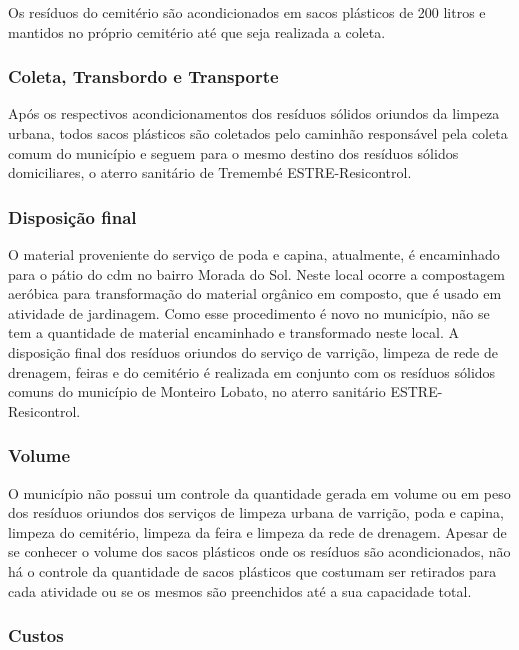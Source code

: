 	
	Os resíduos do cemitério são acondicionados em sacos plásticos de 200 litros e mantidos no próprio cemitério até que seja realizada a coleta.
	
	\subsubsection{Coleta, Transbordo e Transporte}
	
	Após os respectivos acondicionamentos dos resíduos sólidos oriundos da limpeza urbana, todos sacos plásticos são coletados pelo caminhão responsável pela coleta comum do município e seguem para o mesmo destino dos resíduos sólidos domiciliares, o aterro sanitário de Tremembé ESTRE-Resicontrol.
	
	\subsubsection{Disposição final}
	O material proveniente do serviço de poda e capina, atualmente, é encaminhado para o pátio do \gls{cdm} no bairro Morada do Sol. Neste local ocorre a compostagem aeróbica para transformação do material orgânico em composto, que é usado em atividade de jardinagem. Como esse procedimento é novo no município, não se tem a quantidade de material encaminhado e transformado neste local. 
	A disposição final dos resíduos oriundos do serviço de varrição, limpeza de rede de drenagem, feiras e do cemitério é realizada em conjunto com os resíduos sólidos comuns do município de Monteiro Lobato, no aterro sanitário ESTRE-Resicontrol.
	
	\subsubsection{Volume}
	
	O município não possui um controle da quantidade gerada em volume ou em peso dos resíduos oriundos dos serviços de limpeza urbana de varrição, poda e capina, limpeza do cemitério, limpeza da feira e limpeza da rede de drenagem.
	Apesar de se conhecer o volume dos sacos plásticos onde os resíduos são acondicionados, não há o controle da quantidade de sacos plásticos que costumam ser retirados para cada atividade ou se os mesmos são preenchidos até a sua capacidade total.
	
	\subsubsection{Custos}
	
